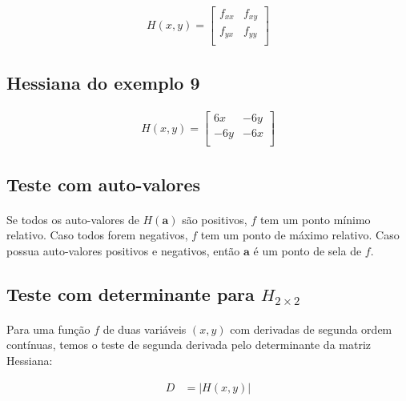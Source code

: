 \documentclass{article}
\begin{document}
        \begin{align*}
            H(x, y) = 
                \begin{bmatrix}
                    f_{xx}&f_{xy}\\
                    f_{yx}&f_{yy}\\
                \end{bmatrix}
        \end{align*}

        \subsection{Hessiana do exemplo 9}
            \begin{align*}
                H(x, y) = 
                \left[
                    \begin{matrix}
                        6x & -6y\\
                        -6y & -6x\\
                    \end{matrix}
                \right]
            \end{align*}

        \subsection{Teste com auto-valores}
            \paragraph{}
            Se todos os auto-valores de $H(\textbf{a})$ são positivos, $f$ tem um ponto mínimo relativo. Caso todos forem negativos,
            $f$ tem um ponto de máximo relativo. Caso possua auto-valores positivos e negativos, então $\textbf{a}$ é um ponto de 
            sela de $f$.

        \subsection{Teste com determinante para $H_{2 \times 2}$}
            \paragraph{}
            Para uma função $f$ de duas variáveis $(x, y)$ com derivadas de segunda ordem contínuas, temos o teste de segunda derivada
            pelo determinante da matriz Hessiana:

            \begin{align*}
                D &= \left| H(x, y) \right|\\
            \end{align*}
            
\end{document}
